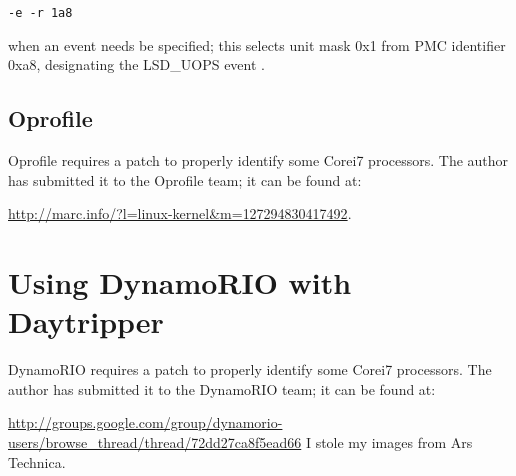 \documentclass[]{sigplanconf}
\begin{document}
\vspace{5mm}
\texttt{-e -r 1a8}
\vspace{5mm}

when an event needs be specified; this selects unit mask 0x1 from PMC identifier
0xa8, designating the LSD\_UOPS event \cite{intelsys}.
\subsection{Oprofile}
Oprofile requires a patch to properly identify some Core\texttrademark i7
processors. The author has submitted it to the Oprofile team; it can be found
at:

\url{http://marc.info/?l=linux-kernel&m=127294830417492}.
\section{Using DynamoRIO with Daytripper}
DynamoRIO requires a patch to properly identify some Core\texttrademark i7
processors. The author has submitted it to the DynamoRIO team; it can be found
at:

\url{http://groups.google.com/group/dynamorio-users/browse_thread/thread/72dd27ca8f5ead66}
\acks
I stole my images from Ars Technica.



\end{document}
